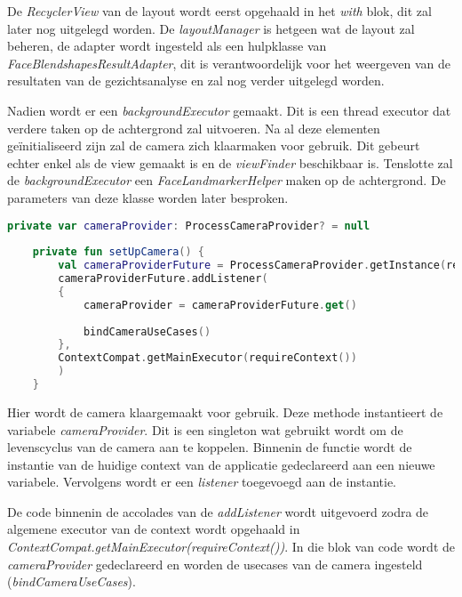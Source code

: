 De \emph{RecyclerView} van de layout wordt eerst opgehaald in het \emph{with} blok, dit zal later nog uitgelegd worden. De \emph{layoutManager} is hetgeen wat de layout zal beheren, de adapter wordt ingesteld als een hulpklasse van \emph{FaceBlendshapesResultAdapter}, dit is verantwoordelijk voor het weergeven van de resultaten van de gezichtsanalyse en zal nog verder uitgelegd worden.

Nadien wordt er een \emph{backgroundExecutor} gemaakt. Dit is een thread executor dat verdere taken op de achtergrond zal uitvoeren. Na al deze elementen geïnitialiseerd zijn zal de camera zich klaarmaken voor gebruik. Dit gebeurt echter enkel als de view gemaakt is en de \emph{viewFinder} beschikbaar is. Tenslotte zal de \emph{backgroundExecutor} een \emph{FaceLandmarkerHelper} maken op de achtergrond. De parameters van deze klasse worden later besproken.

\begin{lstlisting}[language=Kotlin, caption=setUpCamera in CameraFragment.kt]
    private var cameraProvider: ProcessCameraProvider? = null
    
    private fun setUpCamera() {
        val cameraProviderFuture = ProcessCameraProvider.getInstance(requireContext())
        cameraProviderFuture.addListener(
        {
            cameraProvider = cameraProviderFuture.get()
            
            bindCameraUseCases()
        },
        ContextCompat.getMainExecutor(requireContext())
        )
    }
\end{lstlisting}
Hier wordt de camera klaargemaakt voor gebruik. Deze methode instantieert de variabele \emph{cameraProvider}. Dit is een singleton wat gebruikt wordt om de levenscyclus van de camera aan te koppelen. Binnenin de functie wordt de instantie van de huidige context van de applicatie gedeclareerd aan een nieuwe variabele. Vervolgens wordt er een \emph{listener} toegevoegd aan de instantie.

De code binnenin de accolades van de \emph{addListener} wordt uitgevoerd zodra de algemene executor van de context wordt opgehaald in \emph{ContextCompat.getMainExecutor(requireContext())}. In die blok van code wordt de \emph{cameraProvider} gedeclareerd en worden de usecases van de camera ingesteld (\emph{bindCameraUseCases}).

